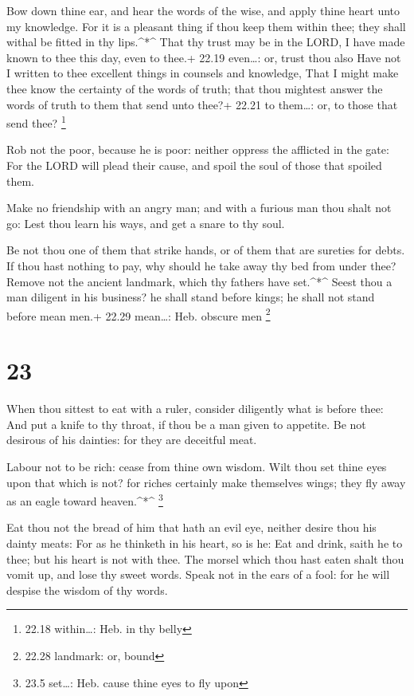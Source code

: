  Bow down thine ear, and hear the words of the wise, and
apply thine heart unto my knowledge.  For it is a pleasant
thing if thou keep them within thee; they shall withal be fitted in thy
lips.\^{}*\^{}  That thy trust may be in the LORD, I have
made known to thee this day, even to thee.+ 22.19 even\ldots: or, trust
thou also  Have not I written to thee excellent things in
counsels and knowledge,  That I might make thee know the
certainty of the words of truth; that thou mightest answer the words of
truth to them that send unto thee?+ 22.21 to them\ldots: or, to those
that send thee? \footnote{22.18 within\ldots: Heb. in thy belly}

 Rob not the poor, because he is poor: neither oppress the
afflicted in the gate:  For the LORD will plead their
cause, and spoil the soul of those that spoiled them.

 Make no friendship with an angry man; and with a furious
man thou shalt not go:  Lest thou learn his ways, and get a
snare to thy soul.

 Be not thou one of them that strike hands, or of them that
are sureties for debts.  If thou hast nothing to pay, why
should he take away thy bed from under thee?  Remove not
the ancient landmark, which thy fathers have set.\^{}*\^{} 
Seest thou a man diligent in his business? he shall stand before kings;
he shall not stand before mean men.+ 22.29 mean\ldots: Heb. obscure men
\footnote{22.28 landmark: or, bound}

\hypertarget{section-22}{%
\section{23}\label{section-22}}

 When thou sittest to eat with a ruler, consider diligently
what is before thee:  And put a knife to thy throat, if thou
be a man given to appetite.  Be not desirous of his
dainties: for they are deceitful meat.

 Labour not to be rich: cease from thine own wisdom.
 Wilt thou set thine eyes upon that which is not? for riches
certainly make themselves wings; they fly away as an eagle toward
heaven.\^{}*\^{} \footnote{23.5 set\ldots: Heb. cause thine eyes to fly
  upon}

 Eat thou not the bread of him that hath an evil eye,
neither desire thou his dainty meats:  For as he thinketh in
his heart, so is he: Eat and drink, saith he to thee; but his heart is
not with thee.  The morsel which thou hast eaten shalt thou
vomit up, and lose thy sweet words.  Speak not in the ears
of a fool: for he will despise the wisdom of thy words.

